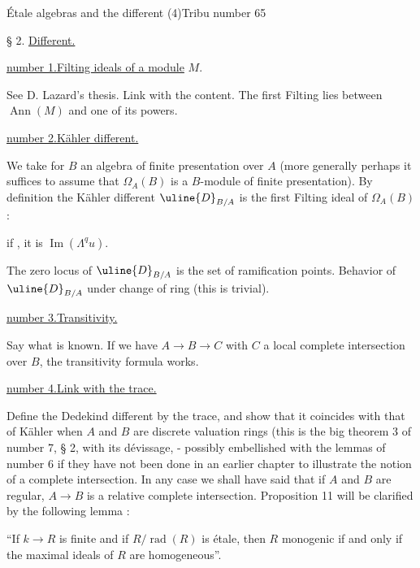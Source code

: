 
Étale algebras and the different (4)\hfill Tribu number 65

§ 2. \uline{Different.}

\uline{number 1.}\quad \uline{Filting ideals of a module} $M$.

See D. Lazard's thesis. Link with the content. The first Filting lies between $\operatorname{Ann}(M)$ and one of its powers.

\uline{number 2.}\quad \uline{Kähler different.}

We take for $B$ an algebra of finite presentation over $A$ (more generally perhaps it suffices to assume that $\Omega_A(B)$ is a $B$-module of finite presentation). By definition the Kähler different $\uline{D}_{B/A}$ is the first Filting ideal of $\Omega_A(B)$ :

if
, it is $\operatorname{Im}(\Lambda^q u)$.

The zero locus of $\uline{D}_{B/A}$ is the set of ramification points. Behavior of $\uline{D}_{B/A}$ under change of ring (this is trivial).

\uline{number 3.}\quad \uline{Transitivity.}

Say what is known. If we have $A\to B\to C$ with $C$ a local complete intersection over $B$, the transitivity formula works.

\uline{number 4.}\quad \uline{Link with the trace.}

Define the Dedekind different by the trace, and show that it coincides with that of Kähler when $A$ and $B$ are discrete valuation rings (this is the big theorem 3 of number 7, § 2, with its dévissage, - possibly embellished with the lemmas of number 6 if they have not been done in an earlier chapter to illustrate the notion of a complete intersection. In any case we shall have said that if $A$ and $B$ are regular, $A\to B$ is a relative complete intersection. Proposition 11 will be clarified by the following lemma :

``If $k\to R$ is finite and if $R/\operatorname{rad}(R)$ is étale, then $R$ monogenic if and only if the maximal ideals of $R$ are homogeneous''.

